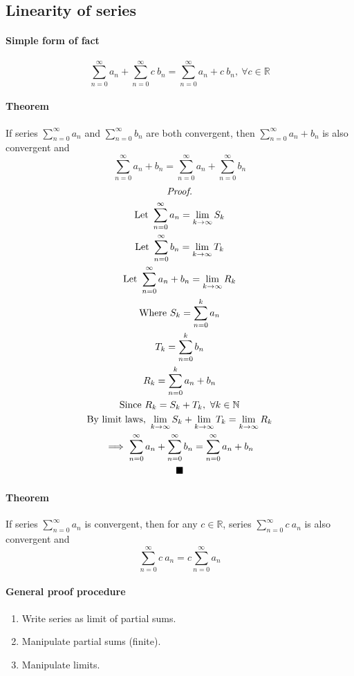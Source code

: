 \documentclass{article}
\newcommand{\R}[0]{\mathbb{R}}
\newcommand{\theorem}[0]{\paragraph{Theorem}}
\newcommand{\N}[0]{\mathbb{N}}
\begin{document}
\subsection{Linearity of series}
\paragraph{Simple form of fact}
\[
	\sum_{n=0}^{\infty}a_n + \sum_{n=0}^{\infty}{c\ b_n} = \sum_{n=0}^{\infty}{a_n + c\ b_n},\ \forall c \in \R
\]
\theorem If series $\sum_{n=0}^{\infty}a_n$ and $\sum_{n=0}^{\infty}b_n$ are both convergent, then $\sum_{n=0}^{\infty}{a_n + b_n}$ is also convergent and 
\[
	\sum_{n=0}^{\infty}{a_n + b_n} = \sum_{n=0}^{\infty}a_n + \sum_{n=0}^{\infty}b_n
\]
\begin{multline*}
	\emph{Proof.} \\
	\text{Let } \sum_{n=0}^{\infty}a_n = \lim_{k\to\infty}S_k \\
	\text{Let } \sum_{n=0}^{\infty}b_n = \lim_{k\to\infty}T_k \\
	\text{Let } \sum_{n=0}^{\infty}{a_n + b_n} = \lim_{k\to\infty}R_k \\
	\text{Where } S_k = \sum_{n=0}^k{a_n} \\
	T_k = \sum_{n=0}^k{b_n} \\
	R_k = \sum_{n=0}^k{a_n + b_n} \\
	\text{Since } R_k = S_k + T_k,\ \forall k \in \N \\
	\text{By limit laws, } \lim_{k\to\infty}S_k + \lim_{k\to\infty}T_k = \lim_{k\to\infty}R_k \\
	\implies \sum_{n=0}^{\infty}a_n + \sum_{n=0}^{\infty}b_n = \sum_{n=0}^{\infty}{a_n + b_n} \\
	\blacksquare
\end{multline*}

\theorem If series $\sum_{n=0}^{\infty}a_n$ is convergent, then for any $c \in \R$, series $\sum_{n=0}^{\infty}{c\ a_n}$ is also convergent and 
\[
	\sum_{n=0}^{\infty}{c\ a_n} = c \sum_{n=0}^{\infty}a_n
\]
\paragraph{General proof procedure}
\begin{enumerate}
	\item Write series as limit of partial sums.
	\item Manipulate partial sums (finite).
	\item Manipulate limits.
\end{enumerate}
\end{document}
